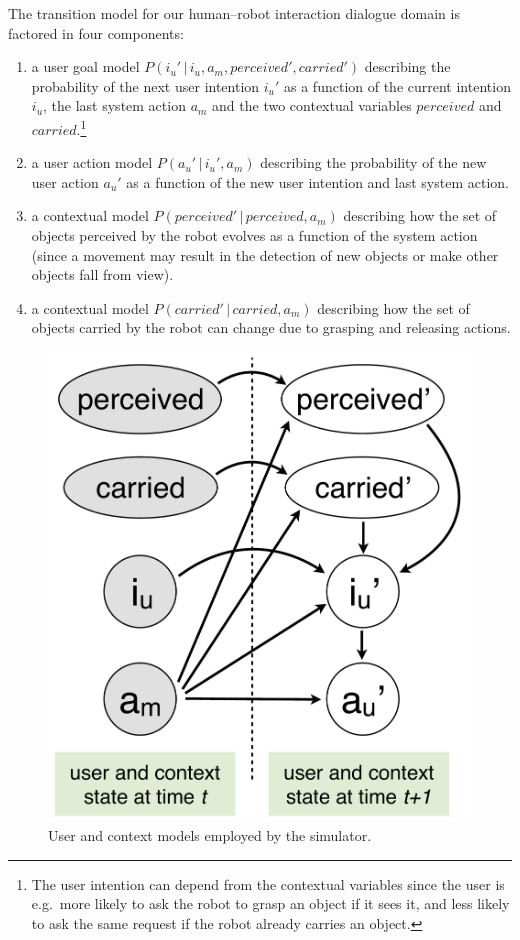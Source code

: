 The transition model for our human--robot interaction dialogue domain is factored in four components:
\begin{enumerate}
\item a user goal model $P(i_u' \, | \, i_u, a_m, \mathit{perceived}', \mathit{carried}')$ describing the probability of the next user intention $i_u'$ as a function of the current intention $i_u$, the last system action $a_m$ and the two contextual variables $\mathit{perceived}$ and $\mathit{carried}$.\footnote{The user intention can depend from the contextual variables since the user is e.g.\ more likely to ask the robot to grasp an object if it sees it, and less likely to ask the same request if the robot already carries an object.}
\item a user action model $P(a_u' \, | \, i_u', a_m)$ describing the probability of the new user action $a_u'$ as a function of the new user intention and last system action.
\item a contextual model $P(\mathit{perceived}' \, | \, \mathit{perceived}, a_m)$ describing how the set of objects perceived by the robot evolves as a function of the system action (since a movement may result in the detection of new objects or make other objects fall from view).
\item a contextual model $P(\mathit{carried}' \, | \, \mathit{carried}, a_m)$ describing how the set of objects carried by the robot can change due to grasping and releasing actions. 
\end{enumerate}

\begin{figure}
\vspace{-2mm}
\centering
\includegraphics[scale=0.25]{imgs/simulatormodels.pdf}
\caption{User and context models employed by the simulator.}
\label{fig:simulatormodels}
\end{figure}

